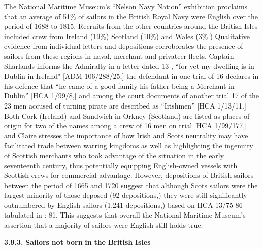 The National Maritime Museum’s “Nelson Navy Nation” exhibition proclaims that an average of 51\% of sailors in the British Royal Navy were English over the period of 1688 to 1815. Recruits from the other countries around the British Isles included crew from Ireland (19\%) Scotland (10\%) and Wales (3\%.) Qualitative evidence from individual letters and depositions corroborates the presence of sailors from these regions in naval, merchant and privateer fleets. Captain Sharlands informs the Admiralty in a letter dated 13 \citealt{April1673}, “for yet my dwelling is in Dublin in Ireland" [ADM 106/288/25,] the defendant in one trial of 16 \citealt{August1727} declares in his defence that “he came of a good family his father being a Merchant in Dublin” [HCA 1/99/8,] and among the court documents of another trial 17 of the 23 men accused of turning pirate are described as “Irishmen” [HCA 1/13/11.] Both Cork (Ireland) and Sandwich in Orkney (Scotland) are listed as places of origin for two of the names among a crew of 16 men on trial [HCA 1/99/177,] and Claire \citet{McLoughlin2015} stresses the importance of how Irish and Scots neutrality may have facilitated trade between warring kingdoms as well as highlighting the ingenuity of Scottish merchants who took advantage of the situation in the early seventeenth century, thus potentially equipping English-owned vessels with Scottish crews for commercial advantage. However, depositions of British sailors between the period of 1665 and 1720 suggest that although Scots sailors were the largest minority of those deposed (92 depositions,) they were still significantly outnumbered by English sailors (1,241 depositions,) based on HCA 13/75-86 tabulated in \citealt{Earle1993}: 81. This suggests that overall the National Maritime Museum’s assertion that a majority of sailors were English still holds true.  

\textbf{3.9.3.} \textbf{Sailors} \textbf{not} \textbf{born} \textbf{in} \textbf{the} \textbf{British} \textbf{Isles}

